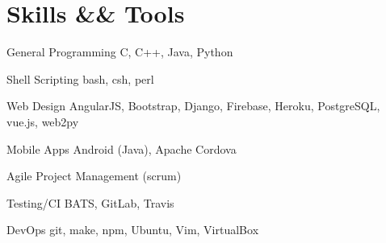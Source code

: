 \documentclass[10pt]{article}
\begin{document}
\section*{Skills \&\& Tools}
\begin{description}
  \begin{multicols}{2}
  \item[General Programming] C, C++, Java, Python
  \item[Shell Scripting] bash, csh, perl
  \item[Web Design] AngularJS, Bootstrap, Django, Firebase,
    Heroku, PostgreSQL, vue.js, web2py
  \item[Mobile Apps] Android (Java), Apache Cordova
  \item[Agile Project Management (scrum)]
  \item[Testing/CI] BATS, GitLab, Travis
  \item[DevOps] git, make, npm, Ubuntu, Vim, VirtualBox
  \end{multicols}
\end{description}
\end{document}

